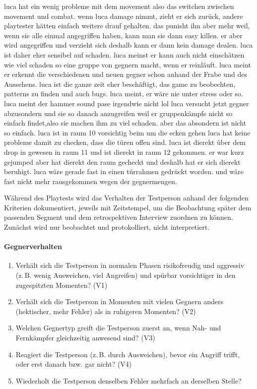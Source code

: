 \documentclass[../Main.tex]{subfiles}
\begin{document}
luca hat ein wenig probleme mit dem movement also das switchen zwischen movement und combat.
wenn luca damage nimmt, zieht er sich zurück, andere playtester hätten einfach weitere drauf gehalten. das punisht ihn aber mehr weil, wenn sie alle einmal angegriffen haben, kann man sie dann easy killen. er aber wird angegriffen und verzieht sich deshalb kann er dann kein damage dealen.
luca ist daher eher sensibel auf schaden.
luca meinst er kann auch nicht einschätzen wie viel schaden so eine gruppe von gegnern macht, wenn er reinläuft.
luca meint er erkennt die verschiedenen und neuen gegner schon anhand der Frabe und des Aussehens.
luca ist die ganze zeit eher beschäftigt, das game zu beobechten, patterns zu finden und auch bugs.
luca meint, er wäre nie unter stress oder so.
luca meint der hammer sound pase irgendwie nicht lol
luca versucht jetzt gegner abzusondern und sie so danach anzugreifen weil er gruppenkämpfe nicht so einfach findet,also sie machen ihm zu viel schaden. aber das absondern ist nicht so einfach.
luca ist in raum 10 vorsichtig beim um die ecken gehen
luca hat keine probleme damit zu checken, dass die türen offen sind.
luca ist dierekt über dem drop in gewesen in raum 11 und ist dierekt in raum 12 gekommen. er war kurz gejumped aber hat dierekt den raum gecheckt und deshalb hat er sich dierekt beruhigt.
luca wäre gerade fast in einen türrahmen gedrückt worden. und wäre fast nicht mehr rausgekommen wegen der gegnermengen.

Während des Playtests wird das Verhalten der Testperson anhand der folgenden Kriterien dokumentiert, jeweils mit Zeitstempel, um die Beobachtung später dem passenden Segment und dem retrospektiven Interview zuordnen zu können. Zunächst wird nur beobachtet und protokolliert, nicht interpretiert.

\paragraph{Gegnerverhalten}
\begin{enumerate}[label=\textbf{B\arabic*}, leftmargin=1.5cm, itemsep=0.5em]
\item Verhält sich die Testperson in normalen Phasen risikofreudig und aggressiv (z.\,B. wenig Ausweichen, viel Angreifen) und spürbar vorsichtiger in den zugespitzten Momenten? \hfill (V1)
\item Verhält sich die Testperson in Momenten mit vielen Gegnern anders (hektischer, mehr Fehler) als in ruhigeren Momenten? \hfill (V2)
\item Welchen Gegnertyp greift die Testperson zuerst an, wenn Nah- und Fernkämpfer gleichzeitig anwesend sind? \hfill (V3)
\item Reagiert die Testperson (z.\,B. durch Ausweichen), bevor ein Angriff trifft, oder erst danach bzw. gar nicht? \hfill (V4)
\item Wiederholt die Testperson denselben Fehler mehrfach an derselben Stelle?
\end{enumerate}
\end{document}
